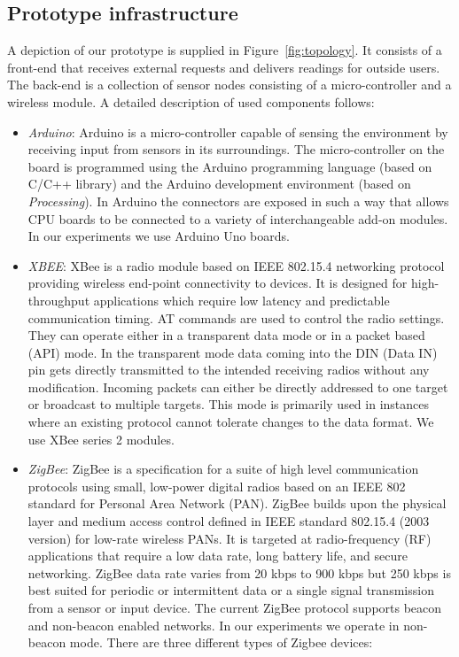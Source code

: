 \subsection{Prototype infrastructure}
A depiction of our prototype is supplied in Figure~\ref{fig:topology}. It consists of a front-end that receives external requests and delivers readings for outside users. The back-end is a collection of sensor nodes consisting of a micro-controller and a wireless module. A detailed description of used components follows:
\begin{itemize}
\item{\emph{Arduino}: Arduino is a micro-controller capable of sensing the environment by receiving input from sensors in its surroundings. The micro-controller on the board is programmed using the Arduino programming language (based on C/C++ library) and the Arduino development environment (based on \textit{Processing}). In Arduino the connectors are exposed in such a way that allows CPU boards to be connected to a variety of interchangeable add-on modules. In our experiments we use Arduino Uno boards.}
\item{\emph{XBEE}: XBee is a radio module based on IEEE 802.15.4 networking protocol providing wireless end-point connectivity to devices.  It is designed for high-throughput applications which require low latency and predictable communication timing. AT commands are used to control the radio settings. They can operate either in a transparent data mode or in a packet based (API) mode. In the transparent mode data coming into the DIN (Data IN) pin gets directly transmitted to the intended receiving radios without any modification. Incoming packets can either be directly addressed to one target or broadcast to multiple targets. This mode is primarily used in instances where an existing protocol cannot tolerate changes to the data format. We use XBee series 2 modules.}
\item{\emph{ZigBee}: ZigBee is a specification for a suite of high level communication protocols using small, low-power digital radios based on an IEEE 802 standard for Personal Area Network (PAN). ZigBee builds upon the physical layer and medium access control defined in IEEE standard 802.15.4 (2003 version) for low-rate wireless PANs.  It is targeted at radio-frequency (RF) applications that require a low data rate, long battery life, and secure networking. ZigBee data rate varies from 20 kbps to 900 kbps but 250 kbps is best suited for periodic or intermittent data or a single signal transmission from a sensor or input device. The current ZigBee protocol supports beacon and non-beacon enabled networks. In our experiments we operate in non-beacon mode. There are three different types of Zigbee devices: 
}
\end{itemize}
